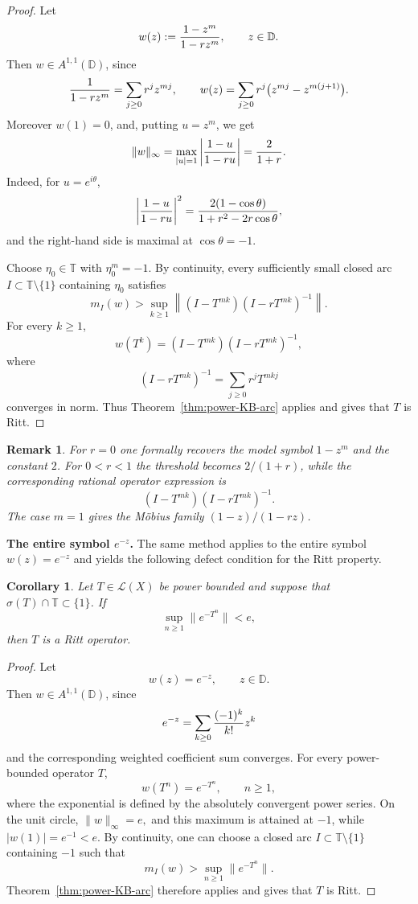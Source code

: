 \documentclass[11pt]{amsart}
\numberwithin{equation}{section}
\newtheorem{corollary}[theorem]{Corollary}
\newtheorem{remark}[theorem]{Remark}
\theoremstyle{definition}
\theoremstyle{plain}
\def\T{\mathbb{T}}
\def\L{L}
\def\D{\mathbb{D}}
\renewcommand{\L}{\mathcal L}
\begin{document}
\begin{proof}
Let
\[
        w(z):={1-z^m\over 1-rz^m},\qquad z\in\D .
\]
Then \(w\in A^{1,1}(\D)\), since
\[
        {1\over 1-rz^m}=\sum_{j\ge0}r^jz^{mj},
        \qquad
        w(z)=\sum_{j\ge0}r^j\bigl(z^{mj}-z^{m(j+1)}\bigr).
\]
Moreover \(w(1)=0\), and, putting \(u=z^m\), we get
\[
        \|w\|_\infty
        =
        \max_{|u|=1}\left|{1-u\over 1-ru}\right|
        =
        {2\over 1+r}.
\]
Indeed, for \(u=e^{i\theta}\),
\[
        \left|{1-u\over 1-ru}\right|^2
        =
        {2(1-\cos\theta)\over 1+r^2-2r\cos\theta},
\]
and the right-hand side is maximal at \(\cos\theta=-1\).

Choose \(\eta_0\in\T\) with \(\eta_0^m=-1\).  By continuity, every
sufficiently small closed arc \(I\subset\T\setminus\{1\}\) containing
\(\eta_0\) satisfies
\[
        m_I(w)>
        \sup_{k\ge1}
        \left\|
        (I-T^{mk})(I-rT^{mk})^{-1}
        \right\|.
\]
For every \(k\ge1\),
\[
        w(T^k)=(I-T^{mk})(I-rT^{mk})^{-1},
\]
where
\[
        (I-rT^{mk})^{-1}=\sum_{j\ge0}r^jT^{mkj}
\]
converges in norm.  Thus Theorem~\ref{thm:power-KB-arc} applies and gives
that \(T\) is Ritt.
\end{proof}

\begin{remark}
For \(r=0\) one formally recovers the model symbol \(1-z^m\) and the
constant \(2\).  For \(0<r<1\) the threshold becomes \(2/(1+r)\), while 
the corresponding rational operator expression is
\[
        (I-T^{mk})(I-rT^{mk})^{-1}.
\]
The case \(m=1\) gives the M\"obius family \((1-z)/(1-rz)\).
\end{remark}

\par\medskip
\noindent\textbf{The entire symbol \(e^{-z}\).}
The same method applies to the entire symbol \(w(z)=e^{-z}\) and yields the following defect condition for the Ritt property.
\begin{corollary}\label{ex:exp-symbol}
Let \(T\in\L(X)\) be power bounded and suppose that
\(\sigma(T)\cap\T\subset\{1\}\).  If
\begin{equation}\label{eq:exp-symbol-defect}
        \sup_{n\ge1}\|e^{-T^n}\|<e,
\end{equation}
then \(T\) is a Ritt operator.
\end{corollary}

\begin{proof}
Let
\[
        w(z)=e^{-z},\qquad z\in\D .
\]
Then \(w\in A^{1,1}(\D)\), since
\[
        e^{-z}=\sum_{k\ge0}{(-1)^k\over k!}z^k
\]
and the corresponding weighted coefficient sum converges.  For every
power-bounded operator \(T\),
\[
        w(T^n)=e^{-T^n},\qquad n\ge1,
\]
where the exponential is defined by the absolutely convergent power series.
On the unit circle,
\(
        \|w\|_{\infty}=e,
\)
and this maximum is attained at \(-1\), while \(|w(1)|=e^{-1}<e\).
By continuity, one can choose a closed arc
\(I\subset\T\setminus\{1\}\) containing \(-1\) such that
\[
        m_I(w)>\sup_{n\ge1}\|e^{-T^n}\|.
\]
Theorem~\ref{thm:power-KB-arc} therefore applies and gives that \(T\) is
Ritt.
\end{proof}
\end{document}
